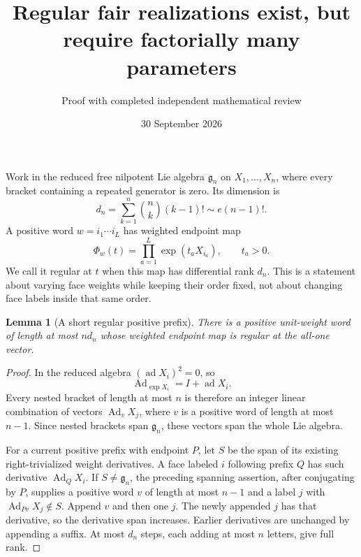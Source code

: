 \documentclass[11pt]{article}
\title{Regular fair realizations exist, but require factorially many parameters}
\author{Proof with completed independent mathematical review}
\date{30 September 2026}
\newtheorem{lemma}{Lemma}
\newcommand{\Ad}{\operatorname{Ad}}
\newcommand{\ad}{\operatorname{ad}}
\begin{document}
\maketitle
Work in the reduced free nilpotent Lie algebra $\mathfrak g_n$ on
$X_1,\ldots,X_n$, where every bracket containing a repeated generator
is zero. Its dimension is
\[
 d_n=\sum_{k=1}^n\binom nk(k-1)!
     \sim e(n-1)!.
\]
A positive word $w=i_1\cdots i_L$ has weighted endpoint map
\[
 \Phi_w(t)=\prod_{a=1}^L\exp(t_aX_{i_a}),\qquad t_a>0.
\]
We call it regular at $t$ when this map has differential rank $d_n$.
This is a statement about varying face weights while keeping their
order fixed, not about changing face labels inside that same order.

\begin{lemma}[A short regular positive prefix]\label{prefix}
There is a positive unit-weight word of length at most $n d_n$ whose
weighted endpoint map is regular at the all-one vector.
\end{lemma}
\begin{proof}
In the reduced algebra $(\ad X_i)^2=0$, so
\[
 \Ad_{\exp X_i}=I+\ad X_i.
\]
Every nested bracket of length at most $n$ is therefore an integer
linear combination of vectors $\Ad_vX_j$, where $v$ is a positive
word of length at most $n-1$. Since nested brackets span
$\mathfrak g_n$, these vectors span the whole Lie algebra.

For a current positive prefix with endpoint $P$, let $S$ be the span
of its existing right-trivialized weight derivatives. A face labeled
$i$ following prefix $Q$ has such derivative $\Ad_QX_i$.
If $S\ne\mathfrak g_n$, the preceding spanning assertion, after
conjugating by $P$, supplies a positive word $v$ of length at most
$n-1$ and a label $j$ with $\Ad_{Pv}X_j\notin S$.
Append $v$ and then one $j$. The newly appended $j$ has that derivative,
so the derivative span increases. Earlier derivatives are unchanged
by appending a suffix. At most $d_n$ steps, each adding at most $n$
letters, give full rank.
\end{proof}
\end{document}
